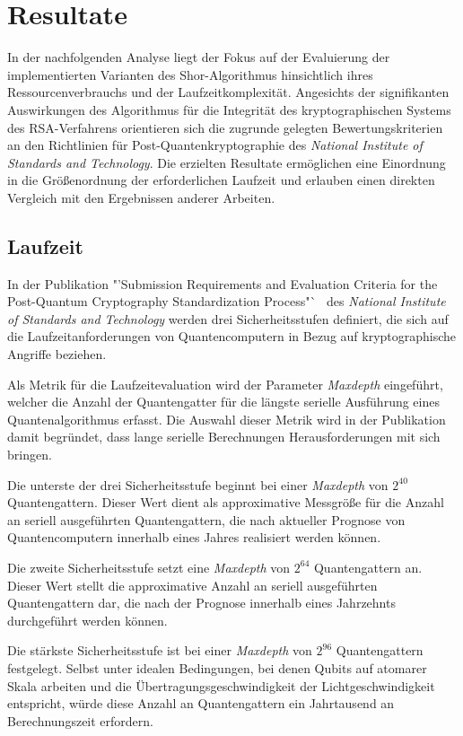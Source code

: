 \section{Resultate}
In der nachfolgenden Analyse liegt der Fokus auf der Evaluierung der implementierten Varianten des Shor-Algorithmus hinsichtlich ihres Ressourcenverbrauchs und 
der Laufzeitkomplexität. 
Angesichts der signifikanten Auswirkungen des Algorithmus für die Integrität des kryptographischen Systems des RSA-Verfahrens  
orientieren sich die zugrunde gelegten Bewertungskriterien an den Richtlinien für Post-Quantenkryptographie des \textit{National Institute of Standards and Technology}. 
Die erzielten Resultate ermöglichen eine Einordnung in die Größenordnung der erforderlichen Laufzeit und 
erlauben einen direkten Vergleich mit den Ergebnissen anderer Arbeiten.

\subsection*{Laufzeit}
In der Publikation "'Submission Requirements and Evaluation Criteria for the Post-Quantum Cryptography Standardization Process"`~\cite{NISTPQC} des \textit{National Institute of Standards and Technology}
werden drei Sicherheitsstufen definiert, die sich auf die Laufzeitanforderungen von Quantencomputern in Bezug auf kryptographische Angriffe beziehen.

Als Metrik für die Laufzeitevaluation wird der Parameter \textit{Maxdepth} eingeführt, 
welcher die Anzahl der Quantengatter für die längste serielle Ausführung eines Quantenalgorithmus erfasst.
Die Auswahl dieser Metrik wird in der Publikation damit begründet, dass lange serielle Berechnungen Herausforderungen mit sich bringen.

Die unterste der drei Sicherheitsstufe beginnt bei einer \textit{Maxdepth} von \(2^{40}\) Quantengattern. 
Dieser Wert dient als approximative Messgröße für die Anzahl an seriell ausgeführten Quantengattern, 
die nach aktueller Prognose von Quantencomputern innerhalb eines Jahres realisiert werden können.

Die zweite Sicherheitsstufe setzt eine \textit{Maxdepth} von \(2^{64}\) Quantengattern an.
Dieser Wert stellt die approximative Anzahl an seriell ausgeführten Quantengattern dar, 
die nach der Prognose innerhalb eines Jahrzehnts durchgeführt werden können.

Die stärkste Sicherheitsstufe ist bei einer \textit{Maxdepth} von \(2^{96}\) Quantengattern festgelegt. 
Selbst unter idealen Bedingungen, 
bei denen Qubits auf atomarer Skala arbeiten und die Übertragungsgeschwindigkeit der Lichtgeschwindigkeit entspricht, 
würde diese Anzahl an Quantengattern ein Jahrtausend an Berechnungszeit erfordern.


